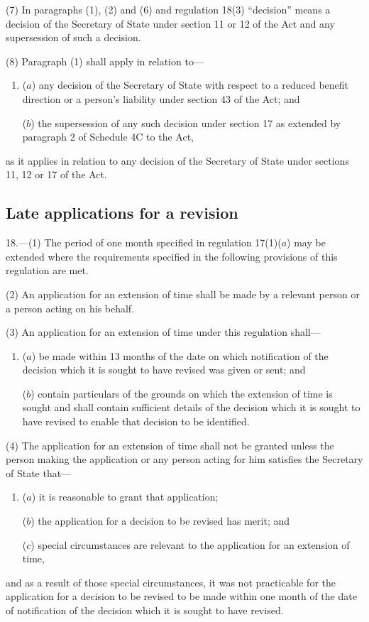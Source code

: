 \documentclass[a4paper,12pt]{article}
\begin{document}
(7) In paragraphs (1), (2) and (6) and regulation 18(3) “decision” means a decision of the Secretary of State under section 11 or 12 of the Act and any supersession of such a decision.

(8) Paragraph (1) shall apply in relation to---
\begin{enumerate}\item[]
($a$) any decision of the Secretary of State with respect to a reduced benefit direction or a person’s liability under section 43 of the Act; and

($b$) the supersession of any such decision under section 17 as extended by paragraph 2 of Schedule 4C to the Act,
\end{enumerate}
as it applies in relation to any decision of the Secretary of State under sections 11, 12 or 17 of the Act.

\subsection[18. Late applications for a revision]{Late applications for a revision}

18.—(1) The period of one month specified in regulation 17(1)($a$) may be extended where the requirements specified in the following provisions of this regulation are met.

(2) An application for an extension of time shall be made by a relevant person or a person acting on his behalf.

(3) An application for an extension of time under this regulation shall---
\begin{enumerate}\item[]
($a$) be made within 13 months of the date on which notification of the decision which it is sought to have revised was given or sent; and

($b$) contain particulars of the grounds on which the extension of time is sought and shall contain sufficient details of the decision which it is sought to have revised to enable that decision to be identified.
\end{enumerate}

(4) The application for an extension of time shall not be granted unless the person making the application or any person acting for him satisfies the Secretary of State that---
\begin{enumerate}\item[]
($a$) it is reasonable to grant that application;

($b$) the application for a decision to be revised has merit; and

($c$) special circumstances are relevant to the application for an extension of time,
\end{enumerate}
and as a result of those special circumstances, it was not practicable for the application for a decision to be revised to be made within one month of the date of notification of the decision which it is sought to have revised.
\end{document}
